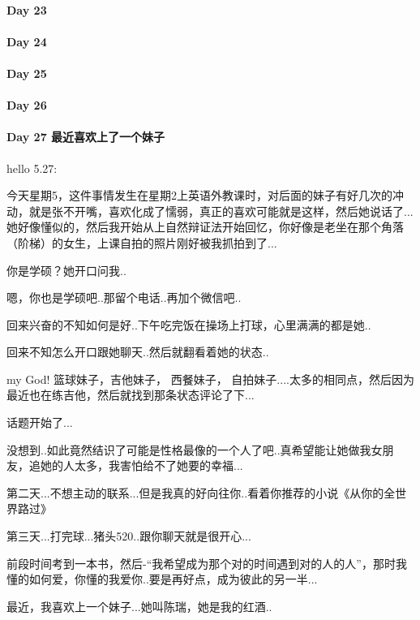 \documentclass[UTF8,a4paper,8pt]{ctexbook}
\begin{document}
 	 \paragraph{Day 23      \quad     }
 	 \paragraph{Day 24      \quad     }
 	 \paragraph{Day 25      \quad     }
 	 \paragraph{Day 26      \quad     }
 	 \paragraph{Day 27  最近喜欢上了一个妹子    \quad     }
	 	 hello 5.27:
	 	 
	 	 今天星期5，这件事情发生在星期2上英语外教课时，对后面的妹子有好几次的冲动，就是张不开嘴，喜欢化成了懦弱，真正的喜欢可能就是这样，然后她说话了...她好像懂似的，然后我开始从上自然辩证法开始回忆，你好像是老坐在那个角落（阶梯）的女生，上课自拍的照片刚好被我抓拍到了...
	 	 
	 	 你是学硕？她开口问我..
	 	 
	 	 嗯，你也是学硕吧..那留个电话..再加个微信吧..
	 	 
	 	 回来兴奋的不知如何是好..下午吃完饭在操场上打球，心里满满的都是她..
	 	 
	 	 回来不知怎么开口跟她聊天..然后就翻看着她的状态..
	 	 
	 	 my God! 篮球妹子，吉他妹子， 西餐妹子， 自拍妹子....太多的相同点，然后因为最近也在练吉他，然后就找到那条状态评论了下...
	 	 
	 	 话题开始了...
	 	 
	 	 没想到..如此竟然结识了可能是性格最像的一个人了吧..真希望能让她做我女朋友，追她的人太多，我害怕给不了她要的幸福... 
	 	 
	 	 第二天...不想主动的联系...但是我真的好向往你..看着你推荐的小说《从你的全世界路过》
	 	 
	 	 第三天...打完球...猪头520..跟你聊天就是很开心...
	 	 
	 	 前段时间考到一本书，然后-“我希望成为那个对的时间遇到对的人的人”，那时我懂的如何爱，你懂的我爱你..要是再好点，成为彼此的另一半...
	 	 
	 	 最近，我喜欢上一个妹子...她叫陈瑞，她是我的红酒..
	 
\end{document}
